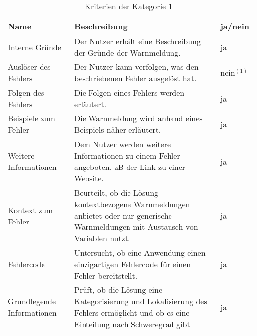 \begin{table}[htp]
    \centering
    \begin{tabularx}{\columnwidth}{XXl}
        \toprule
        \textbf{Name}              & \textbf{Beschreibung}                                                                                                                & \textbf{ja/nein} \\
        \midrule
        Interne Gründe             & Der Nutzer erhält eine Beschreibung der Gründe der Warnmeldung.                                                                      & ja               \\
        \midrule
        Auslöser des Fehlers       & Der Nutzer kann verfolgen, was den beschriebenen Fehler ausgelöst hat.                                                               & nein$^{(1)}$     \\
        \midrule
        Folgen des Fehlers         & Die Folgen eines Fehlers werden erläutert.                                                                                           & ja               \\
        \midrule
        Beispiele zum Fehler       & Die Warnmeldung wird anhand eines Beispiels näher erläutert.                                                                         & ja               \\
        \midrule
        Weitere Informationen      & Dem Nutzer werden weitere Informationen zu einem Fehler angeboten, \ac{zB} der Link zu einer Website.                                & ja               \\
        \midrule
        Kontext zum Fehler         & Beurteilt, ob die Lösung kontextbezogene Warnmeldungen anbietet oder nur generische Warnmeldungen mit Austausch von Variablen nutzt. & ja               \\
        \midrule
        Fehlercode                 & Untersucht, ob eine Anwendung einen einzigartigen Fehlercode für einen Fehler bereitstellt.                                          & ja               \\
        \midrule
        Grundlegende Informationen & Prüft, ob die Lösung eine Kategorisierung und Lokalisierung des Fehlers ermöglicht und ob es eine Einteilung nach Schweregrad gibt   & ja               \\
        \bottomrule
    \end{tabularx}
    \caption{Kriterien der Kategorie 1}
    \label{tbl:criteria-category-1}
\end{table}


